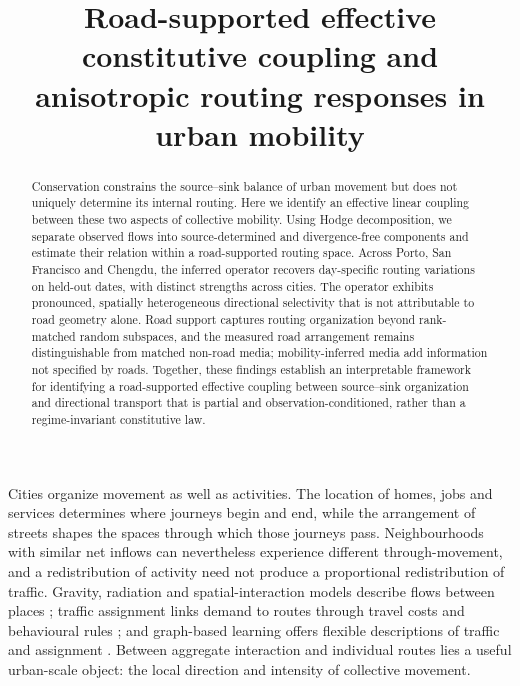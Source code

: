 \documentclass[11pt]{article}
\title{Road-supported effective constitutive coupling and anisotropic routing responses in urban mobility}
\author{}
\date{}
\begin{document}
\maketitle

\begin{abstract}
Conservation constrains the source--sink balance of urban movement but does not uniquely determine its internal routing. Here we identify an effective linear coupling between these two aspects of collective mobility. Using Hodge decomposition, we separate observed flows into source-determined and divergence-free components and estimate their relation within a road-supported routing space. Across Porto, San Francisco and Chengdu, the inferred operator recovers day-specific routing variations on held-out dates, with distinct strengths across cities. The operator exhibits pronounced, spatially heterogeneous directional selectivity that is not attributable to road geometry alone. Road support captures routing organization beyond rank-matched random subspaces, and the measured road arrangement remains distinguishable from matched non-road media; mobility-inferred media add information not specified by roads. Together, these findings establish an interpretable framework for identifying a road-supported effective coupling between source--sink organization and directional transport that is partial and observation-conditioned, rather than a regime-invariant constitutive law.
\end{abstract}

\label{sec:intro}
Cities organize movement as well as activities. The location of homes, jobs and services determines where journeys begin and end, while the arrangement of streets shapes the spaces through which those journeys pass. Neighbourhoods with similar net inflows can nevertheless experience different through-movement, and a redistribution of activity need not produce a proportional redistribution of traffic. Gravity, radiation and spatial-interaction models describe flows between places \cite{simini2012universal,lenormand2016systematic,rong2024survey,cabanastirapu2025gravity,simini2021deepgravity}; traffic assignment links demand to routes through travel costs and behavioural rules \cite{wardrop1952,morandi2024assignment}; and graph-based learning offers flexible descriptions of traffic and assignment \cite{wu2019graphwavenet,liu2024endtoend}. Between aggregate interaction and individual routes lies a useful urban-scale object: the local direction and intensity of collective movement.
\end{document}

